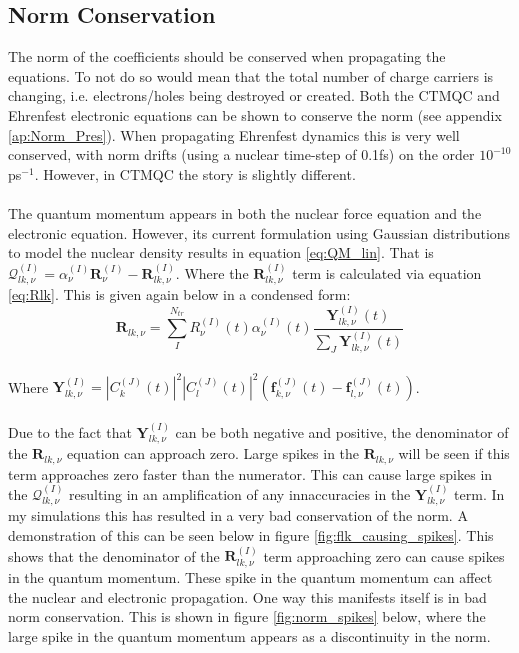 \subsection{Norm Conservation}
The norm of the coefficients should be conserved when propagating the equations. To not do so would mean that the total number of charge carriers is changing, i.e. electrons/holes being destroyed or created. Both the CTMQC and Ehrenfest electronic equations can be shown to conserve the norm (see appendix \ref{ap:Norm_Pres}). When propagating Ehrenfest dynamics this is very well conserved, with norm drifts (using a nuclear time-step of 0.1fs) on the order $10^{-10}$ ps$^{-1}$. However, in CTMQC the story is slightly different.
\\\\
The quantum momentum appears in both the nuclear force equation and the electronic equation. However, its current formulation using Gaussian distributions to model the nuclear density results in equation \eqref{eq:QM_lin}. That is $\mathcal{Q}_{lk,\nu}^{(I)} = \alpha_{\nu}^{(I)}\textbf{R}^{(I)}_\nu - \textbf{R}^{(I)}_{lk, \nu}$. Where the $\textbf{R}^{(I)}_{lk, \nu}$ term is calculated via equation \eqref{eq:Rlk}. This is given again below in a condensed form:
\[\textbf{R}_{lk, \nu} = \sum_{I}^{N_{tr}} R_{\nu}^{(I)}(t) \alpha_{\nu}^{(I)}(t) \frac{\textbf{Y}^{(I)}_{lk, \nu}(t)}{\sum_{J} \textbf{Y}^{(I)}_{lk, \nu}(t)} \]
\\
Where $\textbf{Y}^{(I)}_{lk, \nu} = |C_{k}^{(J)}(t)|^2 |C_{l}^{(J)}(t)|^2 \left( \textbf{f}_{k, \nu}^{(J)}(t) - \textbf{f}_{l, \nu}^{(J)}(t) \right)$.
\\\\
Due to the fact that $\textbf{Y}^{(I)}_{lk, \nu}$ can be both negative and positive, the denominator of the $\textbf{R}_{lk, \nu}$ equation can approach zero. Large spikes in the $\textbf{R}_{lk, \nu}$ will be seen if this term approaches zero faster than the numerator. This can cause large spikes in the $\mathcal{Q}_{lk,\nu}^{(I)}$ resulting in an amplification of any innaccuracies in the $\textbf{Y}^{(I)}_{lk, \nu}$ term. In my simulations this has resulted in a very bad conservation of the norm. A demonstration of this can be seen below in figure \ref{fig:flk_causing_spikes}.
This shows that the denominator of the $\textbf{R}^{(I)}_{lk, \nu}$ term approaching zero can cause spikes in the quantum momentum. These spike in the quantum momentum can affect the nuclear and electronic propagation. One way this manifests itself is in bad norm conservation. This is shown in figure \ref{fig:norm_spikes} below, where the large spike in the quantum momentum appears as a discontinuity in the norm.
